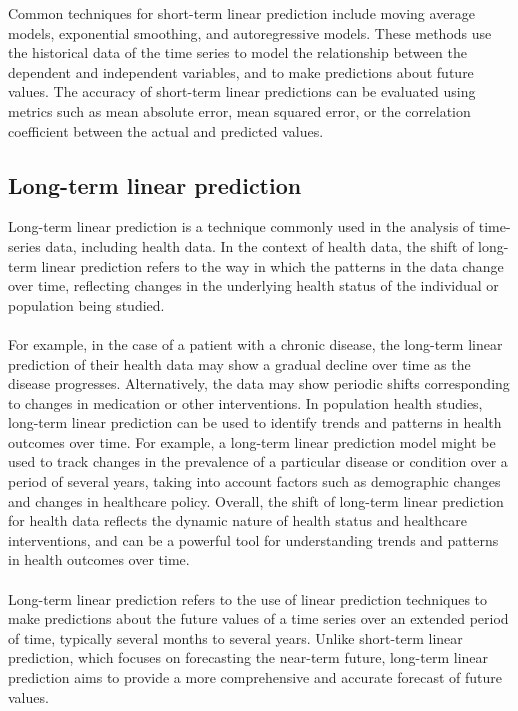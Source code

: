     Common techniques for short-term linear prediction include moving average models, exponential smoothing, and autoregressive models. These methods
    use the historical data of the time series to model the relationship between the dependent and independent variables, and to make predictions
    about future values. The accuracy of short-term linear predictions can be evaluated using metrics such as mean absolute error, mean squared
    error, or the correlation coefficient between the actual and predicted values.
    
    \subsection{Long-term linear prediction} \label{subsec:longtermlp}
    Long-term linear prediction is a technique commonly used in the analysis of time-series data, including health data. In the context of health data,
    the shift of long-term linear prediction refers to the way in which the patterns in the data change over time, reflecting changes in the underlying
    health status of the individual or population being studied.\\
    \\
    For example, in the case of a patient with a chronic disease, the long-term linear prediction of their health data may show a gradual decline over
    time as the disease progresses. Alternatively, the data may show periodic shifts corresponding to changes in medication or other interventions.
    In population health studies, long-term linear prediction can be used to identify trends and patterns in health outcomes over time.
    For example, a long-term linear prediction model might be used to track changes in the prevalence of a particular disease or condition
    over a period of several years, taking into account factors such as demographic changes and changes in healthcare policy.
    Overall, the shift of long-term linear prediction for health data reflects the dynamic nature of health status and healthcare interventions,
    and can be a powerful tool for understanding trends and patterns in health outcomes over time.\\
    \\
    Long-term linear prediction refers to the use of linear prediction techniques to make predictions about the future values of a time series
    over an extended period of time, typically several months to several years. Unlike short-term linear prediction, which focuses on forecasting the
    near-term future, long-term linear prediction aims to provide a more comprehensive and accurate forecast of future values.
